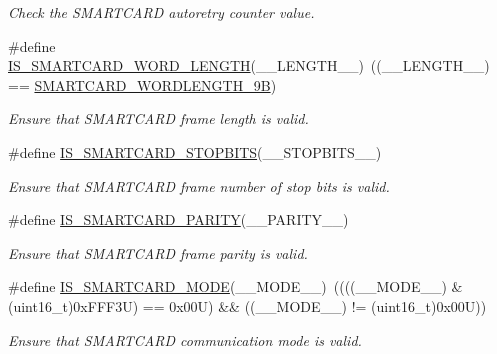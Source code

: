 \begin{DoxyCompactItemize}
\begin{DoxyCompactList}\small\item\em Check the S\+M\+A\+R\+T\+C\+A\+RD autoretry counter value. \end{DoxyCompactList}\item 
\#define \hyperlink{group___s_m_a_r_t_c_a_r_d___private___macros_ga7db1a0183bc5e4803fc2f72e636dbff5}{I\+S\+\_\+\+S\+M\+A\+R\+T\+C\+A\+R\+D\+\_\+\+W\+O\+R\+D\+\_\+\+L\+E\+N\+G\+TH}(\+\_\+\+\_\+\+L\+E\+N\+G\+T\+H\+\_\+\+\_\+)~((\+\_\+\+\_\+\+L\+E\+N\+G\+T\+H\+\_\+\+\_\+) == \hyperlink{group___s_m_a_r_t_c_a_r_d___word___length_ga22f73d114cf13ee0041537303faef14b}{S\+M\+A\+R\+T\+C\+A\+R\+D\+\_\+\+W\+O\+R\+D\+L\+E\+N\+G\+T\+H\+\_\+9B})
\begin{DoxyCompactList}\small\item\em Ensure that S\+M\+A\+R\+T\+C\+A\+RD frame length is valid. \end{DoxyCompactList}\item 
\#define \hyperlink{group___s_m_a_r_t_c_a_r_d___private___macros_ga3295f95845b44fb5518b28685873098d}{I\+S\+\_\+\+S\+M\+A\+R\+T\+C\+A\+R\+D\+\_\+\+S\+T\+O\+P\+B\+I\+TS}(\+\_\+\+\_\+\+S\+T\+O\+P\+B\+I\+T\+S\+\_\+\+\_\+)
\begin{DoxyCompactList}\small\item\em Ensure that S\+M\+A\+R\+T\+C\+A\+RD frame number of stop bits is valid. \end{DoxyCompactList}\item 
\#define \hyperlink{group___s_m_a_r_t_c_a_r_d___private___macros_ga5c10d88b00d317fd6dec54a66ef87b37}{I\+S\+\_\+\+S\+M\+A\+R\+T\+C\+A\+R\+D\+\_\+\+P\+A\+R\+I\+TY}(\+\_\+\+\_\+\+P\+A\+R\+I\+T\+Y\+\_\+\+\_\+)
\begin{DoxyCompactList}\small\item\em Ensure that S\+M\+A\+R\+T\+C\+A\+RD frame parity is valid. \end{DoxyCompactList}\item 
\#define \hyperlink{group___s_m_a_r_t_c_a_r_d___private___macros_ga8e63d3a17d1388f08b5f98c24a872ff1}{I\+S\+\_\+\+S\+M\+A\+R\+T\+C\+A\+R\+D\+\_\+\+M\+O\+DE}(\+\_\+\+\_\+\+M\+O\+D\+E\+\_\+\+\_\+)~((((\+\_\+\+\_\+\+M\+O\+D\+E\+\_\+\+\_\+) \& (uint16\+\_\+t)0x\+F\+F\+F3\+U) == 0x00\+U) \&\& ((\+\_\+\+\_\+\+M\+O\+D\+E\+\_\+\+\_\+) != (uint16\+\_\+t)0x00\+U))
\begin{DoxyCompactList}\small\item\em Ensure that S\+M\+A\+R\+T\+C\+A\+RD communication mode is valid. \end{DoxyCompactList}\item 

\end{DoxyCompactItemize}
